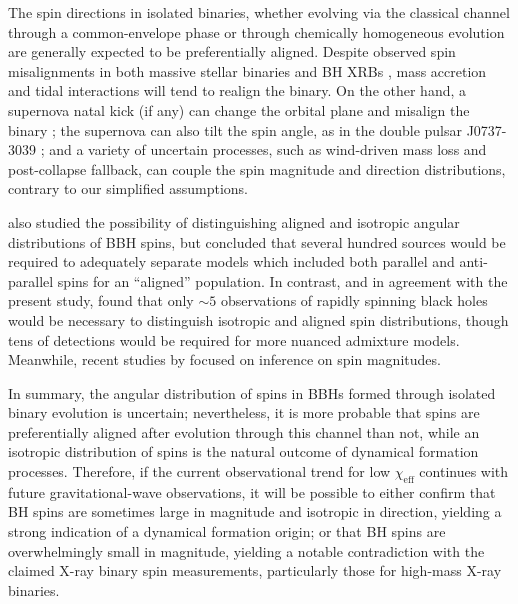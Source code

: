 \documentclass[modern,linenumbers]{aastex61}
\newcommand{\chieff}{\chi_\mathrm{eff}}
\begin{document}
The spin directions in isolated binaries, whether evolving via the
classical channel through a common-envelope phase
\citep{TutukovYungelson:1973,TutukovYungelson:1993,Lipunov:1997,2016Natur.534..512B,Stevenson:2017}
or through chemically homogeneous evolution
\citep{MandeldeMink:2016,Marchant:2016} are generally expected to be
preferentially aligned.  Despite observed spin misalignments in both
massive stellar binaries \citep{Albrecht:2009,2014ApJ...785...83A} and
BH XRBs
\citep{Orosz:2001,Martin:2008b,Martin:2008,MorningstarMiller:2014},
mass accretion and tidal interactions will tend to realign the binary.
On the other hand, a supernova natal kick (if any) can change the
orbital plane and misalign the binary
\citep{2000ApJ...541..319K,2013PhRvD..87j4028G}; the supernova can
also tilt the spin angle, as in the double pulsar J0737-3039
\citep{2011ApJ...742...81F}; and a variety of uncertain processes,
such as wind-driven mass loss and post-collapse fallback, can couple
the spin magnitude and direction distributions, contrary to our
simplified assumptions.

\citet{2017CQGra..34cLT01V} also studied the possibility of
distinguishing aligned and isotropic angular distributions of \ac{BBH}
spins, but concluded that several hundred sources would be required to
adequately separate models which included both parallel and
anti-parallel spins for an ``aligned'' population.  In contrast, and
in agreement with the present study, \citet{Stevenson:2017spin} found
that only $\sim 5$ observations of rapidly spinning black holes would
be necessary to distinguish isotropic and aligned spin distributions,
though tens of detections would be required for more nuanced admixture
models.  Meanwhile, recent studies by
\citet{2017arXiv170306869F,2017arXiv170306223G} focused on inference
on spin magnitudes.

In summary, the angular distribution of spins in \acp{BBH} formed
through isolated binary evolution is uncertain; nevertheless, it is
more probable that spins are preferentially aligned after evolution
through this channel than not, while an isotropic distribution of
spins is the natural outcome of dynamical formation processes.
Therefore, if the current observational trend for low $\chieff$
continues with future gravitational-wave observations, it will be
possible to either confirm that \ac{BH} spins are sometimes large in
magnitude and isotropic in direction, yielding a strong indication of
a dynamical formation origin; or that \ac{BH} spins are overwhelmingly
small in magnitude, yielding a notable contradiction with the claimed
X-ray binary spin measurements, particularly those for high-mass X-ray
binaries.  
\end{document}
